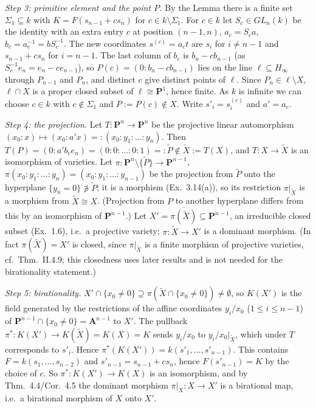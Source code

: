 \documentclass[11pt]{article}
\begin{document}
\emph{Step 3: primitive element and the point $P$.} By the Lemma there is a finite set $\Sigma_1\subseteq k$ with $K=F(s_{n-1}+cs_n)$ for $c\in k\setminus\Sigma_1$. For $c\in k$ let $S_c\in GL_n(k)$ be the identity with an extra entry $c$ at position $(n-1,n)$, $a_c=S_ca$, $b_c=a_c^{-1}=bS_c^{-1}$. The new coordinates $s^{(c)}=a_ct$ are $s_i$ for $i\ne n-1$ and $s_{n-1}+cs_n$ for $i=n-1$. The last column of $b_c$ is $b_n-cb_{n-1}$ (as $S_c^{-1}e_n=e_n-ce_{n-1}$), so $P(c)=(0:b_n-cb_{n-1})$ lies on the line $\ell\subseteq H_\infty$ through $P_{n-1}$ and $P_n$, and distinct $c$ give distinct points of $\ell$. Since $P_n\in\ell\setminus X$, $\ell\cap X$ is a proper closed subset of $\ell\cong\mathbf P^1$, hence finite. As $k$ is infinite we can choose $c\in k$ with $c\notin\Sigma_1$ and $P:=P(c)\notin X$. Write $s'_i=s^{(c)}_i$ and $a'=a_c$.

\emph{Step 4: the projection.} Let $T:\mathbf P^n\to\mathbf P^n$ be the projective linear automorphism $(x_0:x)\mapsto(x_0:a'x)=:(x_0:y_1:\dots:y_n)$. Then $T(P)=(0:a'b_c e_n)=(0:0:\dots:0:1)=:\tilde P\notin\tilde X:=T(X)$, and $T:X\to\tilde X$ is an isomorphism of varieties. Let $\pi:\mathbf P^n\setminus\{\tilde P\}\to\mathbf P^{n-1}$, $\pi(x_0:y_1:\dots:y_n)=(x_0:y_1:\dots:y_{n-1})$ be the projection from $\tilde P$ onto the hyperplane $\{y_n=0\}\not\ni\tilde P$; it is a morphism (Ex.~3.14(a)), so its restriction $\pi|_{\tilde X}$ is a morphism from $\tilde X\cong X$. (Projection from $P$ to another hyperplane differs from this by an isomorphism of $\mathbf P^{n-1}$.) Let $X'=\overline{\pi(\tilde X)}\subseteq\mathbf P^{n-1}$, an irreducible closed subset (Ex.~1.6), i.e.\ a projective variety; $\pi:\tilde X\to X'$ is a dominant morphism. (In fact $\pi(\tilde X)=X'$ is closed, since $\pi|_{\tilde X}$ is a finite morphism of projective varieties, cf.\ Thm.~II.4.9; this closedness uses later results and is not needed for the birationality statement.)

\emph{Step 5: birationality.} $X'\cap\{x_0\ne0\}\supseteq\pi(\tilde X\cap\{x_0\ne0\})\ne\emptyset$, so $K(X')$ is the field generated by the restrictions of the affine coordinates $y_i/x_0$ ($1\le i\le n-1$) of $\mathbf P^{n-1}\cap\{x_0\ne0\}=\mathbf A^{n-1}$ to $X'$. The pullback $\pi^*:K(X')\to K(\tilde X)=K(X)=K$ sends $y_i/x_0$ to $y_i/x_0|_{\tilde X}$, which under $T$ corresponds to $s'_i$. Hence $\pi^*(K(X'))=k(s'_1,\dots,s'_{n-1})$. This contains $F=k(s_1,\dots,s_{n-2})$ and $s'_{n-1}=s_{n-1}+cs_n$, hence $F(s'_{n-1})=K$ by the choice of $c$. So $\pi^*:K(X')\to K(X)$ is an isomorphism, and by Thm.~4.4/Cor.~4.5 the dominant morphism $\pi|_X:X\to X'$ is a birational map, i.e.\ a birational morphism of $X$ onto $X'$.
\end{document}
